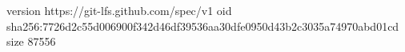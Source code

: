 version https://git-lfs.github.com/spec/v1
oid sha256:7726d2c55d006900f342d46df39536aa30dfe0950d43b2c3035a74970abd01cd
size 87556
